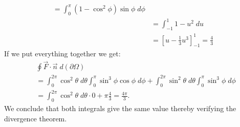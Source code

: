 \documentclass[11pt]{article}
\begin{document}
\begin{solution}
\begin{align*}
        = \int_0^{\pi}(1 - \cos^2\phi)\sin\phi\;d\phi 
        \\&
        = \int_{-1}^1 1 - u^2 \;d u  
        \\&
        = \left[ u - \frac{1}{3}u^3\right]_{-1}^{1} = \frac{4}{3}
    \end{align*}
    If we put everything together we get:
    \begin{align*}
        &
        \oint \vec{F}\cdot \vec{n} \;d(\partial \Omega)
        \\&
        =
        \int_{0}^{2\pi}\cos^2\theta\;d\theta\int_0^{\pi}\sin^3\phi\cos\phi\;d\phi + \int_{0}^{2\pi}\sin^2\theta\;d\theta\int_0^{\pi}\sin^3\phi\;d\phi 
        \\&
        =\int_{0}^{2\pi}\cos^2\theta\;d\theta \cdot 0+ \pi\frac{4}{3} = \frac{4\pi}{3}
        .
    \end{align*}
    We conclude that both integrals give the same value thereby verifying the divergence theorem.
\end{solution}

    
\end{document}
